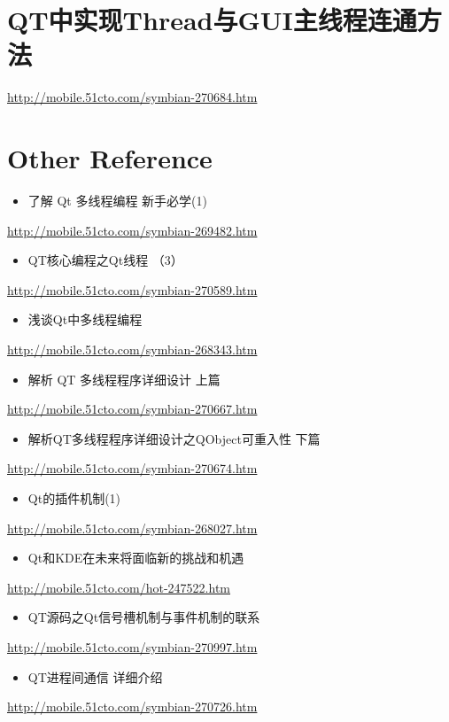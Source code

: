 \documentclass[9pt,b5paper]{article}
\begin{document}
\section{QT中实现Thread与GUI主线程连通方法}
\label{sec-10}
\url{http://mobile.51cto.com/symbian-270684.htm}

\section{Other Reference}
\label{sec-11}
\begin{itemize}
\item 了解 Qt 多线程编程 新手必学(1)
\end{itemize}
\url{http://mobile.51cto.com/symbian-269482.htm}
\begin{itemize}
\item QT核心编程之Qt线程 （3）
\end{itemize}
\url{http://mobile.51cto.com/symbian-270589.htm}
\begin{itemize}
\item 浅谈Qt中多线程编程
\end{itemize}
\url{http://mobile.51cto.com/symbian-268343.htm}
\begin{itemize}
\item 解析 QT 多线程程序详细设计 上篇
\end{itemize}
\url{http://mobile.51cto.com/symbian-270667.htm}
\begin{itemize}
\item 解析QT多线程程序详细设计之QObject可重入性 下篇
\end{itemize}
\url{http://mobile.51cto.com/symbian-270674.htm}
\begin{itemize}
\item Qt的插件机制(1)
\end{itemize}
\url{http://mobile.51cto.com/symbian-268027.htm}
\begin{itemize}
\item Qt和KDE在未来将面临新的挑战和机遇
\end{itemize}
\url{http://mobile.51cto.com/hot-247522.htm}
\begin{itemize}
\item QT源码之Qt信号槽机制与事件机制的联系
\end{itemize}
\url{http://mobile.51cto.com/symbian-270997.htm}
\begin{itemize}
\item QT进程间通信 详细介绍
\end{itemize}
\url{http://mobile.51cto.com/symbian-270726.htm}
\end{document}

